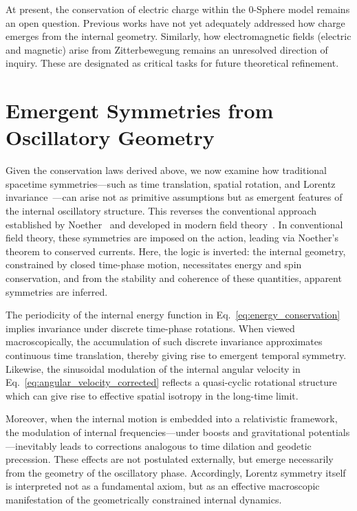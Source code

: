 \documentclass[%
 reprint,
 amsmath,amssymb,
 aps,
]{revtex4-1}
\numberwithin{equation}{section}%
\begin{document}
At present, the conservation of electric charge within the 0-Sphere model remains an open question. Previous works have not yet adequately addressed how charge emerges from the internal geometry. Similarly, how electromagnetic fields (electric and magnetic) arise from Zitterbewegung remains an unresolved direction of inquiry. These are designated as critical tasks for future theoretical refinement.

\section{Emergent Symmetries from Oscillatory Geometry}
\label{sec:symmetry}

Given the conservation laws derived above, we now examine how traditional spacetime symmetries---such as time translation, spatial rotation, and Lorentz invariance~\cite{lorentz1904,poincare1905}---can arise not as primitive assumptions but as emergent features of the internal oscillatory structure. This reverses the conventional approach established by Noether~\cite{noether1918} and developed in modern field theory~\cite{weinberg1995}. In conventional field theory, these symmetries are imposed on the action, leading via Noether's theorem to conserved currents. Here, the logic is inverted: the internal geometry, constrained by closed time-phase motion, necessitates energy and spin conservation, and from the stability and coherence of these quantities, apparent symmetries are inferred.

The periodicity of the internal energy function in Eq.~\eqref{eq:energy_conservation} implies invariance under discrete time-phase rotations. When viewed macroscopically, the accumulation of such discrete invariance approximates continuous time translation, thereby giving rise to emergent temporal symmetry. Likewise, the sinusoidal modulation of the internal angular velocity in Eq.~\eqref{eq:angular_velocity_corrected} reflects a quasi-cyclic rotational structure which can give rise to effective spatial isotropy in the long-time limit.

Moreover, when the internal motion is embedded into a relativistic framework, the modulation of internal frequencies---under boosts and gravitational potentials---inevitably leads to corrections analogous to time dilation and geodetic precession. These effects are not postulated externally, but emerge necessarily from the geometry of the oscillatory phase. Accordingly, Lorentz symmetry itself is interpreted not as a fundamental axiom, but as an effective macroscopic manifestation of the geometrically constrained internal dynamics.
\end{document}
